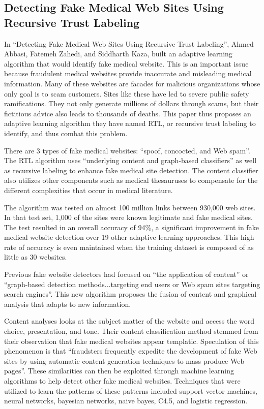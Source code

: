 \documentclass{eptcs}
\begin{document}
\subsection*{Detecting Fake Medical Web Sites Using Recursive Trust Labeling}
In  “Detecting Fake Medical Web Sites Using Recursive Trust Labeling”, Ahmed Abbasi, Fatemeh Zahedi, and Siddharth Kaza, built an adaptive learning algorithm that would identify fake medical website. This is an important issue because fraudulent medical websites provide inaccurate and misleading medical information. Many of these websites are facades for malicious organizations whose only goal is to scam customers. Sites like these have led to severe public safety ramifications. They not only generate millions of dollars through scams, but their fictitious advice also leads to thousands of deaths. This paper thus proposes an adaptive learning algorithm they have named RTL, or recursive trust labeling to identify, and thus combat this problem. 

There are 3 types of fake medical websites: “spoof, concocted, and Web spam”. The RTL algorithm uses “underlying content and graph-based classifiers” as well as recursive labeling to enhance fake medical site detection. The content classifier also utilizes other components such as medical thesauruses to compensate for the different complexities that occur in medical literature. 

The algorithm was tested on almost 100 million links between 930,000 web sites. In that test set, 1,000 of the sites were known legitimate and fake medical sites. The test resulted in an overall accuracy of 94\%, a significant improvement in fake medical website detection over 19 other adaptive learning approaches. This high rate of  accuracy is even maintained when the training dataset is composed of as little as 30 websites. 

Previous fake website detectors had focused on “the application of content” or “graph-based detection methods...targeting end users or Web spam sites targeting search engines”. This new algorithm proposes the fusion of content and graphical analysis that adapts to new information. 

Content analyses looks at the subject matter of the website and access the word choice, presentation, and tone. Their content classification method stemmed from their observation that fake medical websites appear templatic. Speculation of this phenomenon is that “fraudsters frequently expedite the development of fake Web sites by using automatic content generation techniques to mass produce Web pages”. These similarities can then be exploited through machine learning algorithms to help detect other fake medical websites. Techniques that were utilized to learn the patterns of these patterns included support vector machines, neural networks, bayesian networks, naive bayes, C4.5, and logistic regression. 
\end{document}
